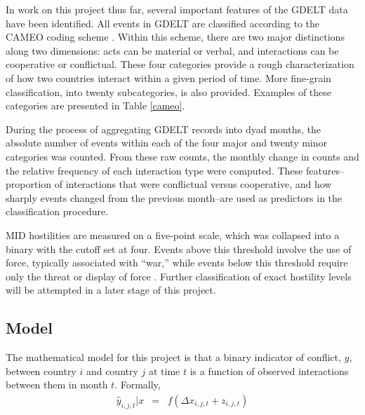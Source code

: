\documentclass[12pt,letterpaper]{article} %
\begin{document}
In work on this project thus far, several important features of the GDELT data have been identified. All events in GDELT are classified according to the CAMEO coding scheme \citep{gerner:etal:2002}. Within this scheme, there are two major distinctions along two dimensions: acts can be material or verbal, and interactions can be cooperative or conflictual. These four categories provide a rough characterization of how two countries interact within a given period of time. More fine-grain classification, into twenty subcategories, is also provided. Examples of these categories are presented in Table \ref{cameo}.


During the process of aggregating GDELT records into dyad months, the absolute number of events within each of the four major and twenty minor categories was counted. 
From these raw counts, the monthly change in counts and the relative frequency of each interaction type were computed. These features--proportion of interactions that were conflictual versus cooperative, and how sharply events changed from the previous month--are used as predictors in the classification procedure.


MID hostilities are measured on a five-point scale, which was collapsed into a binary with the cutoff set at four. Events above this threshold involve the use of force, typically associated with ``war,'' while events below this threshold require only the threat or display of force \citep{ghosn2004mid3}. Further classification of exact hostility levels will be attempted in a later stage of this project. 

\subsection{Model}

The mathematical model for this project is that a binary indicator of conflict, $y$, between country $i$ and country $j$ at time $t$ is a function of observed interactions between them in month $t$. Formally, 
\begin{eqnarray*}
\hat{y}_{i,j,t}|x &=& f(\Delta x_{i,j,t} + z_{i,j,t})
\end{eqnarray*}

\end{document}
